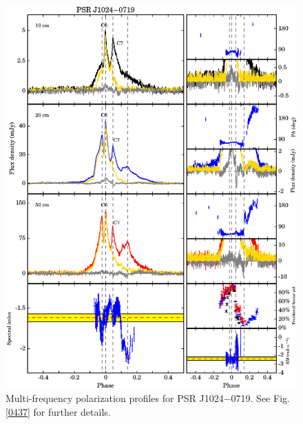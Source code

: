 \documentclass[useAMS,usenatbib]{mn2e}
\begin{document}
\begin{appendices}
\begin{figure}
\begin{center}
\includegraphics[width=6 in]{1024.ps}
\caption{Multi-frequency polarization profiles for PSR J1024$-$0719. 
See Fig. \ref{0437} for further details.}
\label{1024}
\end{center}
\end{figure}


\end{appendices}
\end{document}

